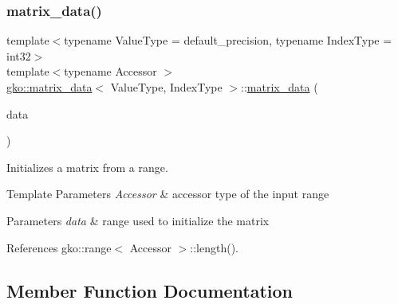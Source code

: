 \subsubsection{\texorpdfstring{matrix\+\_\+data()}{matrix\_data()}\hspace{0.1cm}{\footnotesize\ttfamily [6/6]}}
{\footnotesize\ttfamily template$<$typename Value\+Type = default\+\_\+precision, typename Index\+Type = int32$>$ \\
template$<$typename Accessor $>$ \\
\hyperlink{structgko_1_1matrix__data}{gko\+::matrix\+\_\+data}$<$ Value\+Type, Index\+Type $>$\+::\hyperlink{structgko_1_1matrix__data}{matrix\+\_\+data} (\begin{DoxyParamCaption}\item[{const \hyperlink{classgko_1_1range}{range}$<$ Accessor $>$ \&}]{data }\end{DoxyParamCaption})\hspace{0.3cm}{\ttfamily [inline]}}



Initializes a matrix from a range. 


\begin{DoxyTemplParams}{Template Parameters}
{\em Accessor} & accessor type of the input range\\
\hline
\end{DoxyTemplParams}

\begin{DoxyParams}{Parameters}
{\em data} & range used to initialize the matrix \\
\hline
\end{DoxyParams}


References gko\+::range$<$ Accessor $>$\+::length().



\subsection{Member Function Documentation}
\mbox{\label{structgko_1_1matrix__data_a84056e4ef41884be328ec78554074df1}} 
